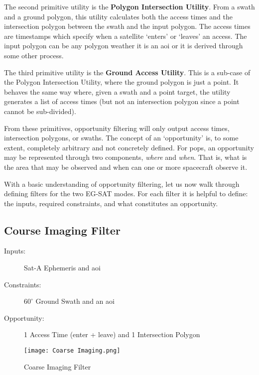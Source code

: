 The second primitive utility is the \textbf{Polygon Intersection Utility}.
From a swath and a ground polygon, this utility calculates both the access
times and the intersection polygon between the swath and the input polygon. The
access times are timestamps which specify when a satellite `enters' or `leaves'
an access. The input polygon can be any polygon weather it is an \gls{aoi} or
it is derived through some other process.

The third primitive utility is the \textbf{Ground Access Utility}. This is a
sub-case of the Polygon Intersection Utility, where the ground polygon is just
a point. It behaves the same way where, given a swath and a point target, the
utility generates a list of access times (but not an intersection polygon since
a point cannot be sub-divided).

From these primitives, opportunity filtering will only output access times,
intersection polygons, or swaths. The concept of an `opportunity' is, to some
extent, completely arbitrary and not concretely defined. For \gls{pops}, an
opportunity may be represented through two components, \textit{where} and
\textit{when}. That is, what is the area that may be observed and when can one
or more spacecraft observe it. 

With a basic understanding of opportunity filtering, let us now walk through
defining filters for the two EG-SAT modes. For each filter it is helpful to
define: the inputs, required constraints, and what constitutes an opportunity.

\subsection{Course Imaging Filter}

\begin{description} 

    \item[Inputs:]  Sat-A Ephemeris and \gls{aoi}

    \item[Constraints:] $60^\circ$ Ground Swath and an \gls{aoi}

    \item[Opportunity:] 1 Access Time (enter + leave) and 1 Intersection Polygon

\end{description} 

\begin{figure}[h]
    \centering
    \texttt{[image: Coarse Imaging.png]} 
    \caption{Coarse Imaging Filter}
    \label{fig:filter-1} 
\end{figure}

